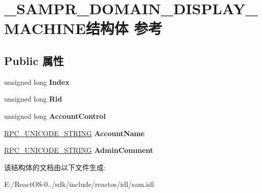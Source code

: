 \hypertarget{struct___s_a_m_p_r___d_o_m_a_i_n___d_i_s_p_l_a_y___m_a_c_h_i_n_e}{}\section{\+\_\+\+S\+A\+M\+P\+R\+\_\+\+D\+O\+M\+A\+I\+N\+\_\+\+D\+I\+S\+P\+L\+A\+Y\+\_\+\+M\+A\+C\+H\+I\+N\+E结构体 参考}
\label{struct___s_a_m_p_r___d_o_m_a_i_n___d_i_s_p_l_a_y___m_a_c_h_i_n_e}
\subsection*{Public 属性}
\begin{DoxyCompactItemize}
\item 
\mbox{\label{struct___s_a_m_p_r___d_o_m_a_i_n___d_i_s_p_l_a_y___m_a_c_h_i_n_e_a2a465101ed44f0567deb57a0842c468b}} 
unsigned long {\bfseries Index}
\item 
\mbox{\label{struct___s_a_m_p_r___d_o_m_a_i_n___d_i_s_p_l_a_y___m_a_c_h_i_n_e_a9c15d1ec94d65f69591802f6b301128f}} 
unsigned long {\bfseries Rid}
\item 
\mbox{\label{struct___s_a_m_p_r___d_o_m_a_i_n___d_i_s_p_l_a_y___m_a_c_h_i_n_e_a774e7489269814274c476ca97a67ae15}} 
unsigned long {\bfseries Account\+Control}
\item 
\mbox{\label{struct___s_a_m_p_r___d_o_m_a_i_n___d_i_s_p_l_a_y___m_a_c_h_i_n_e_a95f1b3f4a6050cbed0691838b1573c8d}} 
\hyperlink{struct___r_p_c___u_n_i_c_o_d_e___s_t_r_i_n_g}{R\+P\+C\+\_\+\+U\+N\+I\+C\+O\+D\+E\+\_\+\+S\+T\+R\+I\+NG} {\bfseries Account\+Name}
\item 
\mbox{\label{struct___s_a_m_p_r___d_o_m_a_i_n___d_i_s_p_l_a_y___m_a_c_h_i_n_e_ad53f431970493b92aacb5269c4f8cf35}} 
\hyperlink{struct___r_p_c___u_n_i_c_o_d_e___s_t_r_i_n_g}{R\+P\+C\+\_\+\+U\+N\+I\+C\+O\+D\+E\+\_\+\+S\+T\+R\+I\+NG} {\bfseries Admin\+Comment}
\end{DoxyCompactItemize}


该结构体的文档由以下文件生成\+:\begin{DoxyCompactItemize}
\item 
E\+:/\+React\+O\+S-\/0../sdk/include/reactos/idl/sam.\+idl\end{DoxyCompactItemize}
